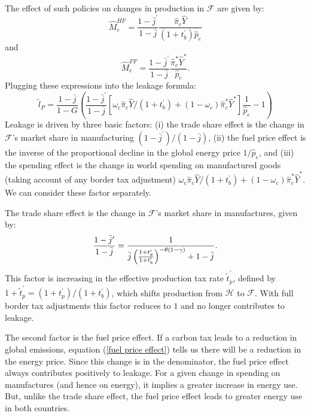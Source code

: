 \documentclass[notitlepage,12pt]{article}
\begin{document}
The effect of such policies on changes in production in $\mathcal{F}$ are
given by:%
\begin{equation*}
\hat{M}_{e}^{HF}=\frac{1-\bar{j}^{\prime }}{1-\bar{j}}\frac{\hat{\pi}_{c}%
\hat{Y}}{\left( 1+t_{b}^{\prime }\right) \hat{p}_{e}}
\end{equation*}%
and%
\begin{equation*}
\hat{M}_{e}^{FF}=\frac{1-\bar{j}^{\prime }}{1-\bar{j}}\frac{\hat{\pi}%
_{c}^{\ast }\hat{Y}^{\ast }}{\hat{p}_{e}}.
\end{equation*}%
Plugging these expressions into the leakage formula:%
\begin{equation*}
\tilde{l}_{P}=\frac{1-\bar{j}}{1-G}\left( \frac{1-\bar{j}^{\prime }}{1-\bar{j%
}}\left[ \omega _{c}\hat{\pi}_{c}\hat{Y}/\left( 1+t_{b}^{\prime }\right)
+\left( 1-\omega _{c}\right) \hat{\pi}_{c}^{\ast }\hat{Y}^{\ast }\right] 
\frac{1}{\hat{p}_{e}}-1\right) 
\end{equation*}%
Leakage is driven by three basic factors: (i) the trade share effect is the
change in $\mathcal{F}$'s market share in manufacturing $\left( 1-\bar{j}%
^{\prime }\right) /\left( 1-\bar{j}\right) $, (ii) the fuel price effect is
the inverse of the proportional decline in the global energy price $1/\hat{p}%
_{e}$, and (iii) the spending effect is the change in world spending on
manufactured goods (taking account of any border tax adjustment) $\omega _{c}%
\hat{\pi}_{c}\hat{Y}/\left( 1+t_{b}^{\prime }\right) +\left( 1-\omega
_{c}\right) \hat{\pi}_{c}^{\ast }\hat{Y}^{\ast }$. We can consider these
factor separately.

The trade share effect is the change in $\mathcal{F}$'s market share in
manufactures, given by:%
\begin{equation*}
\frac{1-\bar{j}^{\prime }}{1-\bar{j}}=\frac{1}{\bar{j}\left( \frac{%
1+t_{p}^{\prime }}{1+t_{b}^{\prime }}\right) ^{-\theta \left( 1-\gamma
\right) }+1-\bar{j}}.
\end{equation*}%
This factor is increasing in the effective production tax rate $\tilde{t}%
_{p}^{\prime }$, defined by $1+\tilde{t}_{p}^{\prime }=(1+t_{p}^{\prime
})/(1+t_{b}^{\prime })$, which shifts production from $\mathcal{H}$ to $%
\mathcal{F}$. With full border tax adjustments this factor reduces to $1$
and no longer contributes to leakage.

The second factor is the fuel price effect. If a carbon tax leads to a
reduction in global emissions, equation (\ref{fuel price effect}) tells us
there will be a reduction in the energy price. Since this change is in the
denominator, the fuel price effect always contributes positively to leakage.
For a given change in spending on manufactures (and hence on energy), it
implies a greater increase in energy use. But, unlike the trade share
effect, the fuel price effect leads to greater energy use in both countries.
\end{document}
